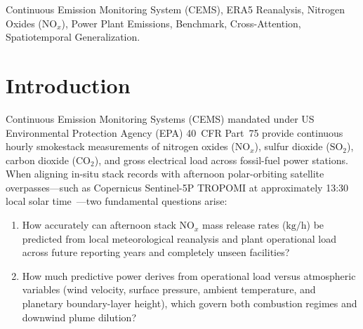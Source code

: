 \documentclass[conference]{IEEEtran}
\begin{document}
\begin{IEEEkeywords}
Continuous Emission Monitoring System (CEMS), ERA5 Reanalysis, Nitrogen Oxides ($\text{NO}_x$), Power Plant Emissions, Benchmark, Cross-Attention, Spatiotemporal Generalization.
\end{IEEEkeywords}

\section{Introduction}
\label{sec:intro}
Continuous Emission Monitoring Systems (CEMS) mandated under US Environmental Protection Agency (EPA) 40~CFR Part~75 provide continuous hourly smokestack measurements of nitrogen oxides ($\text{NO}_x$), sulfur dioxide ($\text{SO}_2$), carbon dioxide ($\text{CO}_2$), and gross electrical load across fossil-fuel power stations. When aligning in-situ stack records with afternoon polar-orbiting satellite overpasses---such as Copernicus Sentinel-5P TROPOMI at approximately 13:30 local solar time~\cite{veefkind2012sentinel}---two fundamental questions arise:
\begin{enumerate}
    \item How accurately can afternoon stack $\text{NO}_x$ mass release rates ($\text{kg/h}$) be predicted from local meteorological reanalysis and plant operational load across future reporting years and completely unseen facilities?
    \item How much predictive power derives from operational load versus atmospheric variables (wind velocity, surface pressure, ambient temperature, and planetary boundary-layer height), which govern both combustion regimes and downwind plume dilution?
\end{enumerate}
\end{document}

